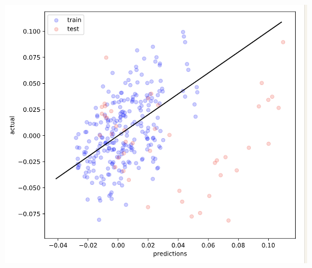 \documentclass[11pt]{article}
\begin{document}
\begin{center}
\includegraphics[width=.9\linewidth]{linear-model.png}
\end{center}
\end{document}
